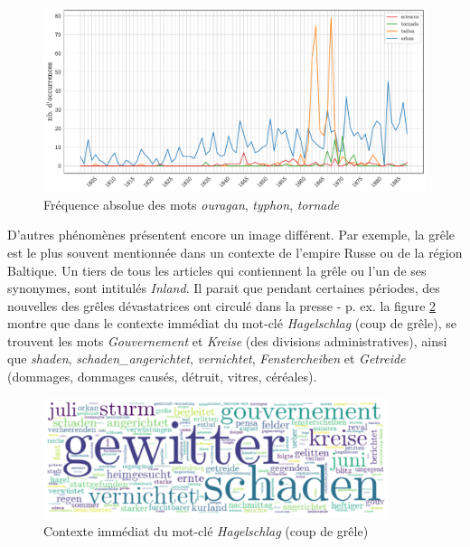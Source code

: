 \documentclass[a4paper,twoside,12pt]{article}
\begin{document}
\begin{figure}[h]
    \centering
    \includegraphics[width=\textwidth]{images/orkan_taifun_tornado.pdf}
    \caption{Fréquence absolue des mots \textit{ouragan}, \textit{typhon}, \textit{tornade}}
    \label{fig:orkan_taifun_tornado}
\end{figure}

D'autres phénomènes présentent encore un image différent. Par exemple, la grêle est le plus souvent mentionnée dans un contexte de l'empire Russe ou de la région Baltique. Un tiers de tous les articles qui contiennent la grêle ou l'un de ses synonymes, sont intitulés \textit{Inland}. Il parait que pendant certaines périodes, des nouvelles des grêles dévastatrices ont circulé dans la presse - p. ex. la figure \ref{fig:hagelschlag} montre que dans le contexte immédiat du mot-clé \textit{Hagelschlag} (coup de grêle), se trouvent les mots \textit{Gouvernement} et \textit{Kreise} (des divisions administratives), ainsi que \textit{shaden}, \textit{schaden\_angerichtet}, \textit{vernichtet}, \textit{Fenstercheiben} et \textit{Getreide} (dommages, dommages causés, détruit, vitres, céréales). \label{about:hagel}

\begin{figure}[h]
    \centering
    \includegraphics[width=0.9\textwidth]{images/wordcloud_hagelschlag.pdf}
    \caption{Contexte immédiat du mot-clé \textit{Hagelschlag} (coup de grêle)}
    \label{fig:hagelschlag}
\end{figure}
\end{document}
